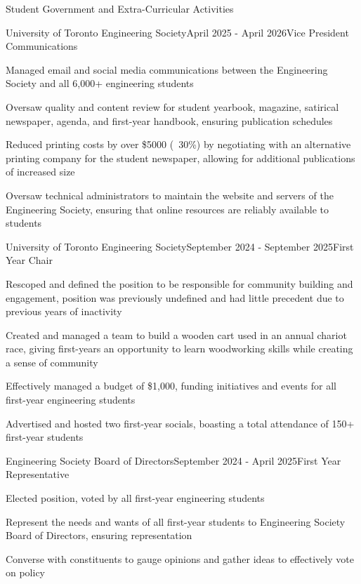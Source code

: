 \documentclass{resume}
\begin{document}
\begin{rSection}{Student Government and Extra-Curricular Activities}

\begin{rSubsection}{University of Toronto Engineering Society}{April 2025 - April 2026}{Vice President Communications}{}
\item Managed email and social media communications between the Engineering Society and all 6,000+ engineering students
\item Oversaw quality and content review for student yearbook, magazine, satirical newspaper, agenda, and first-year handbook, ensuring publication schedules
\item Reduced printing costs by over \$5000 (~30\%) by negotiating with an alternative printing company for the student newspaper, allowing for additional publications of increased size
\item Oversaw technical administrators to maintain the website and servers of the Engineering Society, ensuring that online resources are reliably available to students
\end{rSubsection}


\begin{rSubsection}{University of Toronto Engineering Society}{September 2024 - September 2025}{First Year Chair}{}
\item Rescoped and defined the position to be responsible for community building and engagement, position was previously undefined and had little precedent due to previous years of inactivity
\item Created and managed a team to build a wooden cart used in an annual chariot race, giving first-years an opportunity to learn woodworking skills while creating a sense of community
\item Effectively managed a budget of \$1,000, funding initiatives and events for all first-year engineering students
\item Advertised and hosted two first-year socials, boasting a total attendance of 150+ first-year students
\end{rSubsection}


\begin{rSubsection}{Engineering Society Board of Directors}{September 2024 - April 2025}{First Year Representative}{}
\item Elected position, voted by all first-year engineering students
\item Represent the needs and wants of all first-year students to Engineering Society Board of Directors, ensuring representation
\item Converse with constituents to gauge opinions and gather ideas to effectively vote on policy
\end{rSubsection}


\end{rSection}
\end{document}
